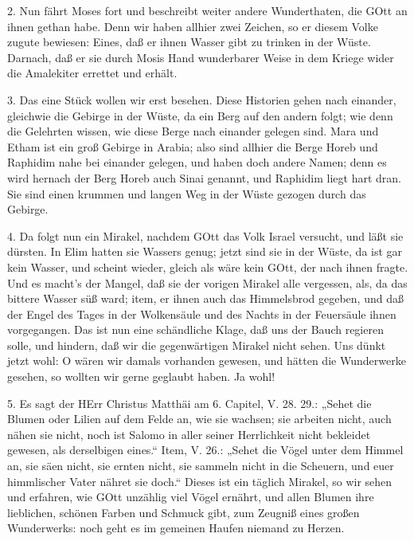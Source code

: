 2. Nun fährt Moses fort und beschreibt weiter andere Wunderthaten, die GOtt an ihnen gethan habe. Denn wir haben allhier zwei Zeichen, so er diesem Volke zugute bewiesen: Eines, daß er ihnen Wasser gibt zu trinken in der Wüste. Darnach, daß er sie durch Mosis Hand wunderbarer Weise in dem Kriege wider die Amalekiter errettet und erhält.

3. Das eine Stück wollen wir erst besehen. Diese Historien gehen nach einander, gleichwie die Gebirge in der Wüste, da ein Berg auf den andern folgt; wie denn die Gelehrten wissen, wie diese Berge nach einander gelegen sind. Mara und Etham ist ein groß Gebirge in Arabia; also sind allhier die Berge Horeb und Raphidim nahe bei einander gelegen, und haben doch andere Namen; denn es wird hernach der Berg Horeb auch Sinai genannt, und Raphidim liegt hart dran. Sie sind einen krummen und langen Weg in der Wüste gezogen durch das Gebirge.

4. Da folgt nun ein Mirakel, nachdem GOtt das Volk Israel versucht, und läßt sie dürsten. In Elim hatten sie Wassers genug; jetzt sind sie in der Wüste, da ist gar kein Wasser, und scheint wieder, gleich als wäre kein GOtt, der nach ihnen fragte. Und es macht’s der Mangel, daß sie der vorigen Mirakel alle vergessen, als, da das bittere Wasser süß ward; item, er ihnen auch das Himmelsbrod gegeben, und daß der Engel des Tages in der Wolkensäule und des Nachts in der Feuersäule ihnen vorgegangen. Das ist nun eine schändliche Klage, daß uns der Bauch regieren solle, und hindern, daß wir die gegenwärtigen Mirakel nicht sehen. Uns dünkt jetzt wohl: O wären wir damals vorhanden gewesen, und hätten die Wunderwerke gesehen, so wollten wir gerne geglaubt haben. Ja wohl!

5. Es sagt der HErr Christus Matthäi am 6. Capitel, V. 28. 29.: „Sehet die Blumen oder Lilien auf dem Felde an, wie sie wachsen; sie arbeiten nicht, auch nähen sie nicht, noch ist Salomo in aller seiner Herrlichkeit nicht bekleidet gewesen, als derselbigen eines.“ Item, V. 26.: „Sehet die Vögel unter dem Himmel an, sie säen nicht, sie ernten nicht, sie sammeln nicht in die Scheuern, und euer himmlischer Vater nähret sie doch.“ Dieses ist ein täglich Mirakel, so wir sehen und erfahren, wie GOtt unzählig viel Vögel ernährt, und allen Blumen ihre lieblichen, schönen Farben und Schmuck gibt, zum Zeugniß eines großen Wunderwerks: noch geht es im gemeinen Haufen niemand zu Herzen.

